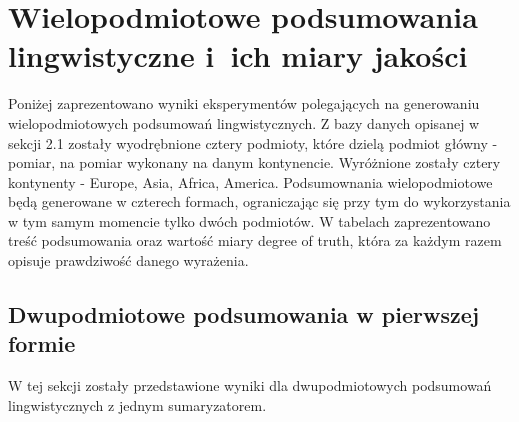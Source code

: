 \documentclass{article}
\begin{document}
\section{Wielopodmiotowe podsumowania lingwistyczne i~ich miary jakości} 
Poniżej zaprezentowano wyniki eksperymentów polegających na generowaniu wielopodmiotowych podsumowań lingwistycznych. Z bazy danych opisanej w sekcji 2.1 zostały wyodrębnione cztery podmioty, które dzielą podmiot główny - pomiar, na pomiar wykonany na danym kontynencie. Wyróżnione zostały cztery kontynenty - Europe, Asia, Africa, America. Podsumownania wielopodmiotowe będą generowane w czterech formach, ograniczając się przy tym do wykorzystania w tym samym momencie tylko dwóch podmiotów. W tabelach zaprezentowano treść podsumowania oraz wartość miary degree of truth, która za każdym razem opisuje prawdziwość danego wyrażenia.

\subsection{Dwupodmiotowe podsumowania w pierwszej formie}
W tej sekcji zostały przedstawione wyniki dla dwupodmiotowych podsumowań lingwistycznych z jednym sumaryzatorem.
\end{document}
